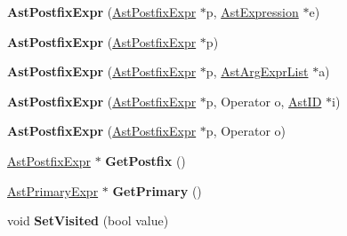 \begin{DoxyCompactItemize}
\item 
\hypertarget{classAstPostfixExpr_a5dd762cbae8160f94a661ecdf3a90770}{{\bfseries Ast\-Postfix\-Expr} (\hyperlink{classAstPostfixExpr}{Ast\-Postfix\-Expr} $\ast$p, \hyperlink{classAstExpression}{Ast\-Expression} $\ast$e)}\label{classAstPostfixExpr_a5dd762cbae8160f94a661ecdf3a90770}

\item 
\hypertarget{classAstPostfixExpr_af17b325f38a7138728773d86a9342105}{{\bfseries Ast\-Postfix\-Expr} (\hyperlink{classAstPostfixExpr}{Ast\-Postfix\-Expr} $\ast$p)}\label{classAstPostfixExpr_af17b325f38a7138728773d86a9342105}

\item 
\hypertarget{classAstPostfixExpr_a4a1ae7a03b7b29e6641f47479e58aa3b}{{\bfseries Ast\-Postfix\-Expr} (\hyperlink{classAstPostfixExpr}{Ast\-Postfix\-Expr} $\ast$p, \hyperlink{classAstArgExprList}{Ast\-Arg\-Expr\-List} $\ast$a)}\label{classAstPostfixExpr_a4a1ae7a03b7b29e6641f47479e58aa3b}

\item 
\hypertarget{classAstPostfixExpr_a094735e6e2f593a42cc2b9aabc44213b}{{\bfseries Ast\-Postfix\-Expr} (\hyperlink{classAstPostfixExpr}{Ast\-Postfix\-Expr} $\ast$p, Operator o, \hyperlink{classAstID}{Ast\-I\-D} $\ast$i)}\label{classAstPostfixExpr_a094735e6e2f593a42cc2b9aabc44213b}

\item 
\hypertarget{classAstPostfixExpr_a71f3baa5264259031d95741e65de1e07}{{\bfseries Ast\-Postfix\-Expr} (\hyperlink{classAstPostfixExpr}{Ast\-Postfix\-Expr} $\ast$p, Operator o)}\label{classAstPostfixExpr_a71f3baa5264259031d95741e65de1e07}

\item 
\hypertarget{classAstPostfixExpr_a2cac2396d2ad13b9b9af3832aac846be}{\hyperlink{classAstPostfixExpr}{Ast\-Postfix\-Expr} $\ast$ {\bfseries Get\-Postfix} ()}\label{classAstPostfixExpr_a2cac2396d2ad13b9b9af3832aac846be}

\item 
\hypertarget{classAstPostfixExpr_a646f9aa0e61d183640dc85ea0a07c91c}{\hyperlink{classAstPrimaryExpr}{Ast\-Primary\-Expr} $\ast$ {\bfseries Get\-Primary} ()}\label{classAstPostfixExpr_a646f9aa0e61d183640dc85ea0a07c91c}

\item 
\hypertarget{classAstPostfixExpr_a50dcbfd3bad3f563df90a9ad0b7e7238}{void {\bfseries Set\-Visited} (bool value)}\label{classAstPostfixExpr_a50dcbfd3bad3f563df90a9ad0b7e7238}


\end{DoxyCompactItemize}
